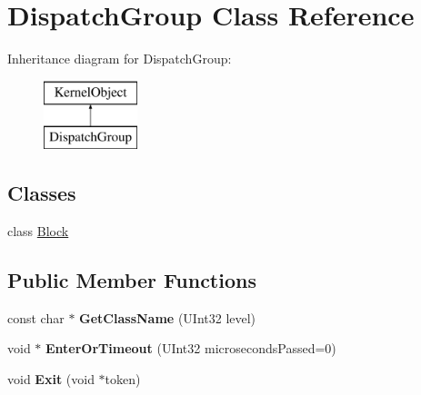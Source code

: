\hypertarget{class_dispatch_group}{}\section{Dispatch\+Group Class Reference}
\label{class_dispatch_group}
Inheritance diagram for Dispatch\+Group\+:\begin{figure}[H]
\begin{center}
\leavevmode
\includegraphics[height=2.000000cm]{class_dispatch_group}
\end{center}
\end{figure}
\subsection*{Classes}
\begin{DoxyCompactItemize}
\item 
class \hyperlink{class_dispatch_group_1_1_block}{Block}
\end{DoxyCompactItemize}
\subsection*{Public Member Functions}
\begin{DoxyCompactItemize}
\item 
\mbox{\label{class_dispatch_group_afc5d3ca0a4653b8086ed75d2c9e4d189}} 
const char $\ast$ {\bfseries Get\+Class\+Name} (U\+Int32 level)
\item 
\mbox{\label{class_dispatch_group_a7b46159a6164d8766a7a1e76ef6afb5e}} 
void $\ast$ {\bfseries Enter\+Or\+Timeout} (U\+Int32 microseconds\+Passed=0)
\item 
\mbox{\label{class_dispatch_group_a91a5a5ff7c16c99dc095a3a71a6d67c1}} 
void {\bfseries Exit} (void $\ast$token)
\end{DoxyCompactItemize}
